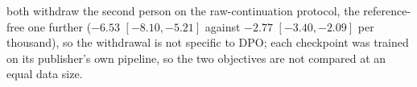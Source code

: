 both withdraw the second person on the raw-continuation protocol, the reference-free one further ($-6.53$ $[-8.10,-5.21]$ against $-2.77$ $[-3.40,-2.09]$ per thousand), so the withdrawal is not specific to DPO; each checkpoint was trained on its publisher's own pipeline, so the two objectives are not compared at an equal data size.
